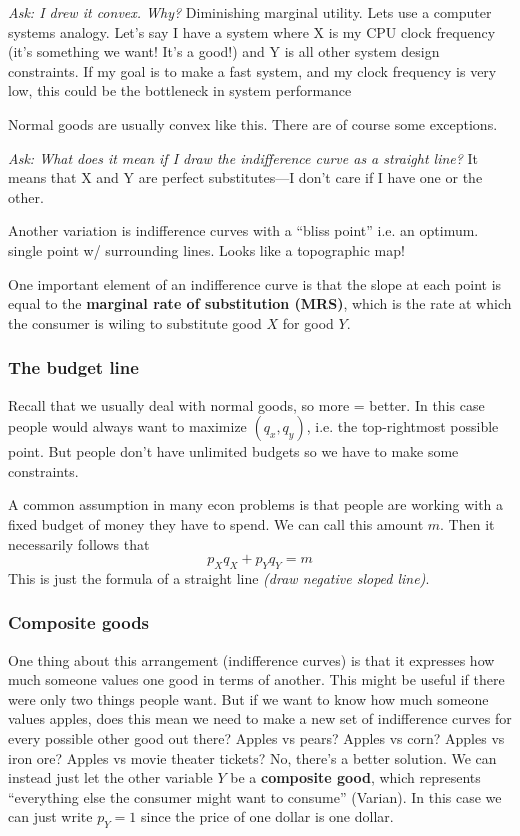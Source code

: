 \documentclass[11pt]{article}
\begin{document}
{\it Ask: I drew it convex. Why?} Diminishing marginal utility. Lets use a computer systems analogy. Let's say I have a system where X is my CPU clock frequency (it's something we want! It's a good!) and Y is all other system design constraints. If my goal is to make a fast system, and my clock frequency is very low, this could be the bottleneck in system performance

Normal goods are usually convex like this. There are of course some exceptions.

{\it Ask: What does it mean if I draw the indifference curve as a straight line?} It means that X and Y are perfect substitutes---I don't care if I have one or the other. 

Another variation is indifference curves with a ``bliss point'' i.e. an optimum. single point w/ surrounding lines. Looks like a topographic map!

One important element of an indifference curve is that the slope at each point is equal to the {\bf marginal rate of substitution (MRS)}, which is the rate at which the consumer is wiling to substitute good $X$ for good $Y$.

\subsubsection{The budget line}

Recall that we usually deal with normal goods, so more = better. In this case people would always want to maximize $(q_x, q_y)$, i.e. the top-rightmost possible point. But people don't have unlimited budgets so we have to make some constraints.

A common assumption in many econ problems is that people are working with a fixed budget of money they have to spend. We can call this amount $m$. Then it necessarily follows that
$$p_Xq_X + p_Yq_Y = m$$
This is just the formula of a straight line {\it (draw negative sloped line)}.


\subsubsection{Composite goods}
One thing about this arrangement (indifference curves) is that it expresses how much someone values one good in terms of another. This might be useful if there were only two things people want. But if we want to know how much someone values apples, does this mean we need to make a new set of indifference curves for every possible other good out there? Apples vs pears? Apples vs corn? Apples vs iron ore? Apples vs movie theater tickets? No, there's a better solution. We can instead just let the other variable $Y$ be a {\bf composite good}, which represents ``everything else the consumer might want to consume'' (Varian). In this case we can just write $p_Y = 1$ since the price of one dollar is one dollar.
\end{document}
